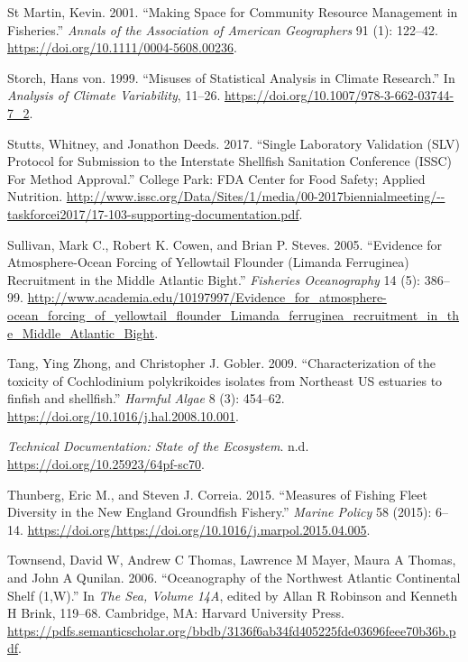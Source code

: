 \documentclass[
]{book}
\newlength{\cslhangindent}
\newenvironment{cslreferences}%
  {\setlength{\parindent}{0pt}%
  \everypar{\setlength{\hangindent}{\cslhangindent}}\ignorespaces}%
  {\par}
\begin{document}
\begin{cslreferences}
\leavevmode\hypertarget{ref-st_martin_making_2001}{}%
St Martin, Kevin. 2001. ``Making Space for Community Resource Management in Fisheries.'' \emph{Annals of the Association of American Geographers} 91 (1): 122--42. \url{https://doi.org/10.1111/0004-5608.00236}.

\leavevmode\hypertarget{ref-VonStorch1999a}{}%
Storch, Hans von. 1999. ``Misuses of Statistical Analysis in Climate Research.'' In \emph{Analysis of Climate Variability}, 11--26. \url{https://doi.org/10.1007/978-3-662-03744-7_2}.

\leavevmode\hypertarget{ref-Stutts2017}{}%
Stutts, Whitney, and Jonathon Deeds. 2017. ``Single Laboratory Validation (SLV) Protocol for Submission to the Interstate Shellfish Sanitation Conference (ISSC) For Method Approval.'' College Park: FDA Center for Food Safety; Applied Nutrition. \url{http://www.issc.org/Data/Sites/1/media/00-2017biennialmeeting/--taskforcei2017/17-103-supporting-documentation.pdf}.

\leavevmode\hypertarget{ref-sullivan_evidence_2005}{}%
Sullivan, Mark C., Robert K. Cowen, and Brian P. Steves. 2005. ``Evidence for Atmosphere-Ocean Forcing of Yellowtail Flounder (Limanda Ferruginea) Recruitment in the Middle Atlantic Bight.'' \emph{Fisheries Oceanography} 14 (5): 386--99. \url{http://www.academia.edu/10197997/Evidence_for_atmosphere-ocean_forcing_of_yellowtail_flounder_Limanda_ferruginea_recruitment_in_the_Middle_Atlantic_Bight}.

\leavevmode\hypertarget{ref-Tang2009}{}%
Tang, Ying Zhong, and Christopher J. Gobler. 2009. ``Characterization of the toxicity of Cochlodinium polykrikoides isolates from Northeast US estuaries to finfish and shellfish.'' \emph{Harmful Algae} 8 (3): 454--62. \url{https://doi.org/10.1016/j.hal.2008.10.001}.

\leavevmode\hypertarget{ref-techdoc}{}%
\emph{Technical Documentation: State of the Ecosystem}. n.d. \url{https://doi.org/10.25923/64pf-sc70}.

\leavevmode\hypertarget{ref-eric_m_thunberg_measures_2015}{}%
Thunberg, Eric M., and Steven J. Correia. 2015. ``Measures of Fishing Fleet Diversity in the New England Groundfish Fishery.'' \emph{Marine Policy} 58 (2015): 6--14. \url{https://doi.org/https://doi.org/10.1016/j.marpol.2015.04.005}.

\leavevmode\hypertarget{ref-townsend_oceanography_2006}{}%
Townsend, David W, Andrew C Thomas, Lawrence M Mayer, Maura A Thomas, and John A Qunilan. 2006. ``Oceanography of the Northwest Atlantic Continental Shelf (1,W).'' In \emph{The Sea, Volume 14A}, edited by Allan R Robinson and Kenneth H Brink, 119--68. Cambridge, MA: Harvard University Press. \url{https://pdfs.semanticscholar.org/bbdb/3136f6ab34fd405225fde03696feee70b36b.pdf}.


\end{cslreferences}
\end{document}
